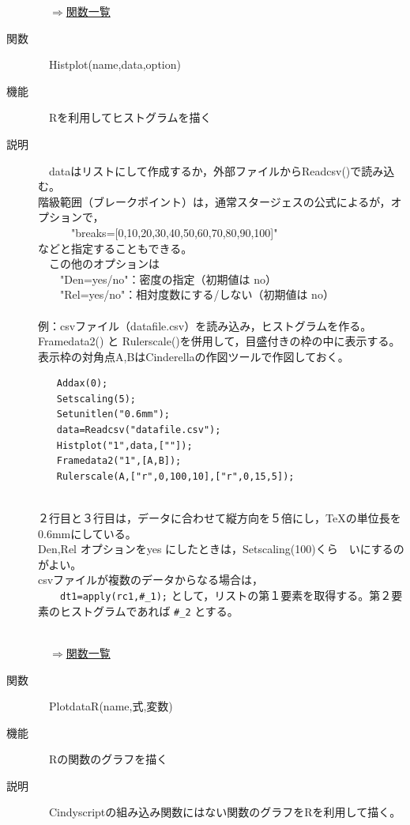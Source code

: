 \documentclass[papersize,a4paper,12pt,uplatex]{jsarticle}
\begin{document}
\begin{description}
\begin{flushright}　\hyperlink{functionlist}{$\Rightarrow$関数一覧}\end{flushright}
\hypertarget{histplot}{}
\item[関数]　Histplot(name,data,option)
\item[機能]　Rを利用してヒストグラムを描く
\item[説明]　dataはリストにして作成するか，外部ファイルからReadcsv()で読み込む。\\
階級範囲（ブレークポイント）は，通常スタージェスの公式によるが，オプションで，\\
　　　"breaks=[0,10,20,30,40,50,60,70,80,90,100]"\\
などと指定することもできる。\\
　この他のオプションは\\
　　"Den=yes/no"：密度の指定（初期値は no）\\
　　"Rel=yes/no"：相対度数にする/しない（初期値は no）\\
　\\
例：csvファイル（datafile.csv）を読み込み，ヒストグラムを作る。Framedata2() と Rulerscale()を併用して，目盛付きの枠の中に表示する。表示枠の対角点A,BはCinderellaの作図ツールで作図しておく。
\begin{verbatim}
　　Addax(0);
　　Setscaling(5);
　　Setunitlen("0.6mm");
　　data=Readcsv("datafile.csv");
　　Histplot("1",data,[""]);
　　Framedata2("1",[A,B]);
　　Rulerscale(A,["r",0,100,10],["r",0,15,5]);
\end{verbatim}
　　\\

２行目と３行目は，データに合わせて縦方向を５倍にし，TeXの単位長を0.6mmにしている。\\
Den,Rel オプションをyes にしたときは，Setscaling(100)くら　いにするのがよい。\\
csvファイルが複数のデータからなる場合は，\\
　　\verb|dt1=apply(rc1,#_1);|
として，リストの第１要素を取得する。第２要素のヒストグラムであれば  \verb|#_2| とする。\\
　\\
\begin{flushright}　\hyperlink{functionlist}{$\Rightarrow$関数一覧}\end{flushright}

\hypertarget{plotdatar}{}
\item[関数]　PlotdataR(name,式,変数)
\item[機能]　Rの関数のグラフを描く
\item[説明]　Cindyscriptの組み込み関数にはない関数のグラフをRを利用して描く。\\


\end{description}
\end{document}
